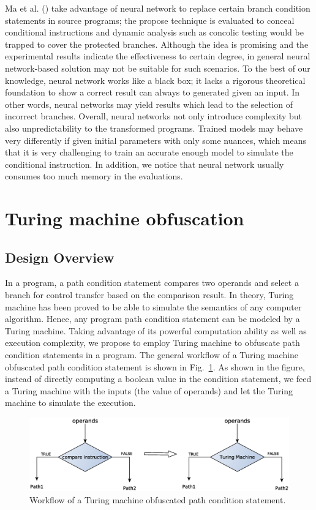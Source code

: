 \documentclass[lnicst]{svmultln}
\newcommand{\F}{Fig.}
\begin{document}
Ma et al. (\cite{Ma}) take advantage of neural network to replace certain branch
condition statements in source programs; the propose technique is evaluated to
conceal conditional instructions and dynamic analysis such as concolic testing
would be trapped to cover the protected branches. Although the idea is promising
and the experimental results indicate the effectiveness to certain degree, in
general neural network-based solution may not be suitable for such scenarios. To
the best of our knowledge, neural network works like a black box; it lacks a
rigorous theoretical foundation to show a correct result can always to generated
given an input. In other words, neural networks may yield results which lead to
the selection of incorrect branches. Overall, neural networks not only introduce
complexity but also unpredictability to the transformed programs. Trained models
may behave very differently if given initial parameters with only some nuances,
which means that it is very challenging to train an accurate enough model to
simulate the conditional instruction. In addition, we notice that neural network
usually consumes too much memory in the evaluations.

%
\section{Turing machine obfuscation}
%
\subsection{Design Overview}
In a program, a path condition statement compares two operands and select a
branch for control transfer based on the comparison result. In theory, Turing
machine has been proved to be able to simulate the semantics of any computer
algorithm. Hence, any program path condition statement can be modeled by a
Turing machine. Taking advantage of its powerful computation ability as well as
execution complexity, we propose to employ Turing machine to obfuscate path
condition statements in a program. The general workflow of a Turing machine
obfuscated path condition statement is shown in \F~\ref{fig:two}. As shown in
the figure, instead of directly computing a boolean value in the condition
statement, we feed a Turing machine with the inputs (the value of operands) and
let the Turing machine to simulate the execution.

\begin{figure}
 \includegraphics[width=\linewidth]{figure2.eps}
 \caption{Workflow of a Turing machine obfuscated path condition statement.}
 \label{fig:two}
\end{figure}
\end{document}

